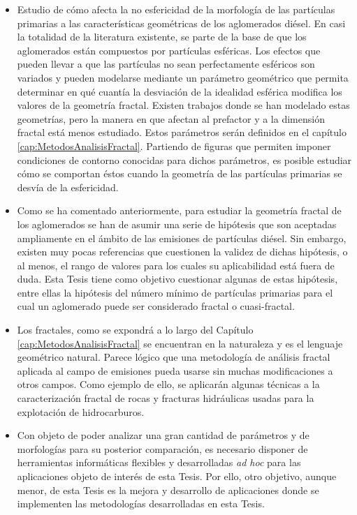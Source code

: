 \begin{itemize}

\item Estudio de cómo afecta la no esfericidad de la morfología de las partículas primarias a las características geométricas de los aglomerados diésel. En casi la totalidad de la literatura existente, se parte de la base de que los aglomerados están compuestos por partículas esféricas. Los efectos que pueden llevar a que las partículas no sean perfectamente esféricos son variados y pueden modelarse mediante un parámetro geométrico que permita determinar en qué cuantía la desviación de la idealidad esférica modifica los valores de la geometría fractal. Existen trabajos donde se han modelado estas geometrías, pero la manera en que afectan al prefactor y a la dimensión fractal está menos estudiado. Estos parámetros serán definidos en el capítulo \ref{cap:MetodosAnalisisFractal}. Partiendo de figuras que permiten imponer condiciones de contorno conocidas para dichos parámetros, es posible estudiar cómo se comportan éstos cuando la geometría de las partículas primarias se desvía de la esfericidad.

\item Como se ha comentado anteriormente, para estudiar la geometría fractal de los aglomerados se han de asumir una serie de hipótesis que son aceptadas ampliamente en el ámbito de las emisiones de partículas diésel. Sin embargo, existen muy pocas referencias que cuestionen la validez de dichas hipótesis, o al menos, el rango de valores para los cuales su aplicabilidad está fuera de duda. Esta Tesis tiene como objetivo cuestionar algunas de estas hipótesis, entre ellas la hipótesis del número mínimo de partículas primarias para el cual un aglomerado puede ser considerado fractal o cuasi-fractal.

\item Los fractales, como se expondrá a lo largo del Capítulo \ref{cap:MetodosAnalisisFractal} se encuentran en la naturaleza y es el lenguaje geométrico natural. Parece lógico que una metodología de análisis fractal aplicada al campo de emisiones pueda usarse sin muchas modificaciones a otros campos. Como ejemplo de ello, se aplicarán algunas técnicas a la caracterización fractal de rocas y fracturas hidráulicas usadas para la explotación de hidrocarburos.

\item Con objeto de poder analizar una gran cantidad de parámetros y de morfologías para su posterior comparación, es necesario disponer de herramientas informáticas flexibles y desarrolladas \textit{ad hoc} para las aplicaciones objeto de interés de esta Tesis. Por ello, otro objetivo, aunque menor, de esta Tesis es la mejora y desarrollo de aplicaciones donde se implementen las metodologías desarrolladas en esta Tesis.

\end{itemize}

